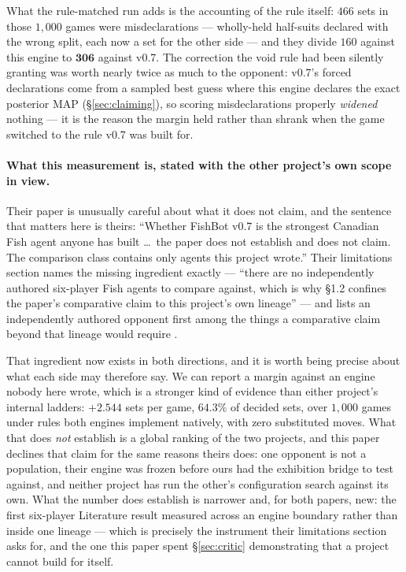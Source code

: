 \documentclass[11pt,a4paper]{article}
\begin{document}
What the rule-matched run adds is the accounting of the rule itself: $466$
sets in those $1{,}000$ games were misdeclarations --- wholly-held
half-suits declared with the wrong split, each now a set for the other side
--- and they divide $160$ against this engine to $\mathbf{306}$ against
v0.7. The correction the void rule had been silently granting was worth
nearly twice as much to the opponent: v0.7's forced declarations come from
a sampled best guess where this engine declares the exact posterior MAP
(\S\ref{sec:claiming}), so scoring misdeclarations properly \emph{widened}
nothing --- it is the reason the margin held rather than shrank when the
game switched to the rule v0.7 was built for.

\paragraph{What this measurement is, stated with the other project's own
scope in view.} Their paper is unusually careful about what it does not
claim, and the sentence that matters here is theirs: ``Whether FishBot v0.7
is the strongest Canadian Fish agent anyone has built \dots\ the paper does
not establish and does not claim. The comparison class contains only agents
this project wrote.'' Their limitations section names the missing
ingredient exactly --- ``there are no independently authored six-player Fish
agents to compare against, which is why \S1.2 confines the paper's
comparative claim to this project's own lineage'' --- and lists an
independently authored opponent first among the things a comparative claim
beyond that lineage would require \citep{dylan2026fishbot}.

That ingredient now exists in both directions, and it is worth being
precise about what each side may therefore say. We can report a margin
against an engine nobody here wrote, which is a stronger kind of evidence
than either project's internal ladders: $+2.544$ sets per game, $64.3\%$ of
decided sets, over $1{,}000$ games under rules both engines implement
natively, with zero substituted moves. What that does \emph{not} establish
is a global ranking of the two projects, and this paper declines that claim
for the same reasons theirs does: one opponent is not a population, their
engine was frozen before ours had the exhibition bridge to test against,
and neither project has run the other's configuration search against its
own. What the number does establish is narrower and, for both papers,
new: the first six-player Literature result measured across an engine
boundary rather than inside one lineage --- which is precisely the
instrument their limitations section asks for, and the one this paper
spent \S\ref{sec:critic} demonstrating that a project cannot build for
itself.
\end{document}
